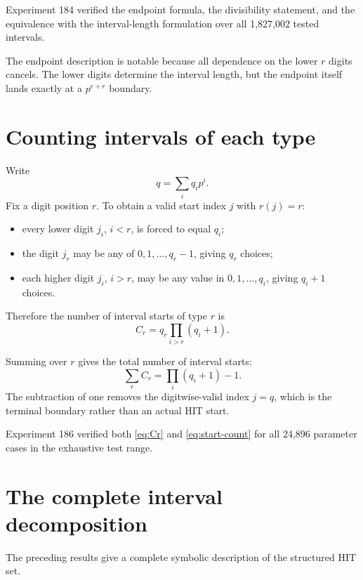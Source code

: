 \documentclass[11pt,a4paper]{article}
\theoremstyle{definition}
\theoremstyle{remark}
\begin{document}
Experiment 184 verified the endpoint formula, the divisibility statement, and the equivalence with the interval-length formulation over all 1,827,002 tested intervals.

The endpoint description is notable because all dependence on the lower $r$ digits cancels.  The lower digits determine the interval length, but the endpoint itself lands exactly at a $p^{e+r}$ boundary.

\section{Counting intervals of each type}

Write
\[
 q=\sum_i q_i p^i.
\]
Fix a digit position $r$.  To obtain a valid start index $j$ with $r(j)=r$:
\begin{itemize}
  \item every lower digit $j_i$, $i<r$, is forced to equal $q_i$;
  \item the digit $j_r$ may be any of $0,1,\dots,q_r-1$, giving $q_r$ choices;
  \item each higher digit $j_i$, $i>r$, may be any value in $0,1,\dots,q_i$, giving $q_i+1$ choices.
\end{itemize}
Therefore the number of interval starts of type $r$ is
\begin{equation}
 \boxed{
 C_r=q_r\prod_{i>r}(q_i+1).
 }
 \label{eq:Cr}
\end{equation}

Summing over $r$ gives the total number of interval starts:
\begin{equation}
 \sum_r C_r
 =
 \prod_i(q_i+1)-1.
 \label{eq:start-count}
\end{equation}
The subtraction of one removes the digitwise-valid index $j=q$, which is the terminal boundary rather than an actual HIT start.

Experiment 186 verified both \eqref{eq:Cr} and \eqref{eq:start-count} for all 24,896 parameter cases in the exhaustive test range.

\section{The complete interval decomposition}

The preceding results give a complete symbolic description of the structured HIT set.
\end{document}
